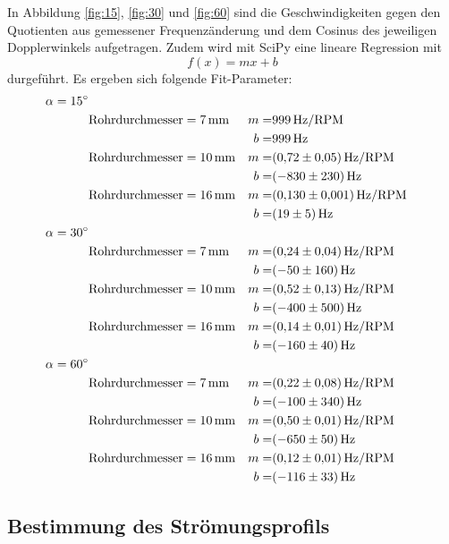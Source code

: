 In Abbildung \ref{fig:15}, \ref{fig:30} und \ref{fig:60} sind die Geschwindigkeiten gegen den Quotienten aus gemessener Frequenzänderung und dem Cosinus des jeweiligen
Dopplerwinkels aufgetragen.
Zudem wird mit SciPy eine lineare Regression mit
\begin{equation}
  f(x)= mx + b
\end{equation}
durgeführt.
Es ergeben sich folgende Fit-Parameter:
\begin{align*}
	\alpha = \SI{15}{\degree} 	& \\
								& \text{Rohrdurchmesser}=\SI{7}{\milli\meter} 	& m=&\SI{999}{\hertz\per RPM}\\
								&												& b=&\SI{999}{\hertz}\\
								& \text{Rohrdurchmesser}=\SI{10}{\milli\meter} 	& m=&\SI{0.72\pm0.05}{\hertz\per RPM}\\
								&												& b=&\SI{-830\pm230}{\hertz}\\
								& \text{Rohrdurchmesser}=\SI{16}{\milli\meter} 	& m=&\SI{0.130\pm0.001}{\hertz\per RPM}\\
								&												& b=&\SI{19\pm5}{\hertz}\\
	\alpha = \SI{30}{\degree} 	& \\
								& \text{Rohrdurchmesser}=\SI{7}{\milli\meter} 	& m=&\SI{0.24\pm0.04}{\hertz\per RPM}\\
								&												& b=&\SI{-50\pm160}{\hertz}\\
								& \text{Rohrdurchmesser}=\SI{10}{\milli\meter} 	& m=&\SI{0.52\pm0.13}{\hertz\per RPM}\\
								&												& b=&\SI{-400\pm500}{\hertz}\\
								& \text{Rohrdurchmesser}=\SI{16}{\milli\meter} 	& m=&\SI{0.14\pm0.01}{\hertz\per RPM}\\
								&												& b=&\SI{-160\pm40}{\hertz}\\
	\alpha = \SI{60}{\degree} 	& \\
								& \text{Rohrdurchmesser}=\SI{7}{\milli\meter} 	& m=&\SI{0.22\pm0.08}{\hertz\per RPM}\\
								&												& b=&\SI{-100\pm340}{\hertz}\\
								& \text{Rohrdurchmesser}=\SI{10}{\milli\meter} 	& m=&\SI{0.50\pm0.01}{\hertz\per RPM}\\
								&												& b=&\SI{-650\pm50}{\hertz}\\
								& \text{Rohrdurchmesser}=\SI{16}{\milli\meter} 	& m=&\SI{0.12\pm0.01}{\hertz\per RPM}\\
								&												& b=&\SI{-116\pm33}{\hertz}\\
\end{align*}




\subsection{Bestimmung des Strömungsprofils}
